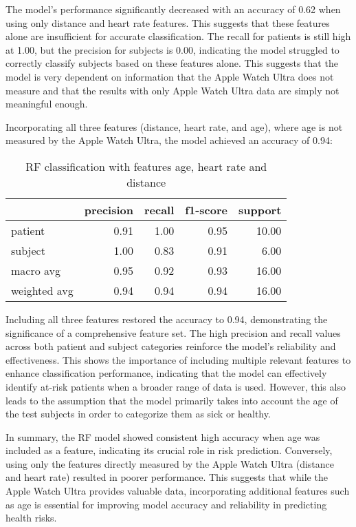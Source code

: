 The model's performance significantly decreased with an accuracy of 0.62 when using only distance and heart rate features. This suggests that these features alone are insufficient for accurate classification. The recall for patients is still high at 1.00, but the precision for subjects is 0.00, indicating the model struggled to correctly classify subjects based on these features alone. This suggests that the model is very dependent on information that the Apple Watch Ultra does not measure and that the results with only Apple Watch Ultra data are simply not meaningful enough.

Incorporating all three features (distance, heart rate, and age), where age is not measured by the Apple Watch Ultra, the model achieved an accuracy of 0.94:

\FloatBarrier
\begin{table}[H]
\centering
\begin{tabular}{lrrrr}
\toprule
{} & precision & recall & f1-score & support \\
\midrule
patient & 0.91 & 1.00 & 0.95 & 10.00 \\
subject & 1.00 & 0.83 & 0.91 & 6.00 \\
macro avg & 0.95 & 0.92 & 0.93 & 16.00 \\
weighted avg & 0.94 & 0.94 & 0.94 & 16.00 \\
\bottomrule
\end{tabular}
\caption{RF classification with features age, heart rate and distance}
\label{table:RFageHeartrateDist}
\end{table}
\FloatBarrier

Including all three features restored the accuracy to 0.94, demonstrating the significance of a comprehensive feature set. The high precision and recall values across both patient and subject categories reinforce the model's reliability and effectiveness. This shows the importance of including multiple relevant features to enhance classification performance, indicating that the model can effectively identify at-risk patients when a broader range of data is used. However, this also leads to the assumption that the model primarily takes into account the age of the test subjects in order to categorize them as sick or healthy.

In summary, the RF model showed consistent high accuracy when age was included as a feature, indicating its crucial role in risk prediction. Conversely, using only the features directly measured by the Apple Watch Ultra (distance and heart rate) resulted in poorer performance. This suggests that while the Apple Watch Ultra provides valuable data, incorporating additional features such as age is essential for improving model accuracy and reliability in predicting health risks.

